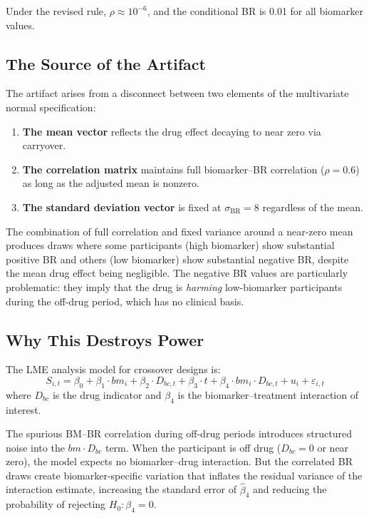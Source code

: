\documentclass[11pt]{article}
\begin{document}
Under the revised rule, $\rho \approx 10^{-6}$, and the
conditional BR is 0.01 for all biomarker values.

\subsection{The Source of the Artifact}

The artifact arises from a disconnect between two elements of
the multivariate normal specification:

\begin{enumerate}
\item \textbf{The mean vector} reflects the drug effect
  decaying to near zero via carryover.
\item \textbf{The correlation matrix} maintains full
  biomarker--BR correlation ($\rho = 0.6$) as long as the
  adjusted mean is nonzero.
\item \textbf{The standard deviation vector} is fixed at
  $\sigma_{\text{BR}} = 8$ regardless of the mean.
\end{enumerate}

The combination of full correlation and fixed variance around
a near-zero mean produces draws where some participants (high
biomarker) show substantial positive BR and others (low
biomarker) show substantial negative BR, despite the mean
drug effect being negligible. The negative BR values are
particularly problematic: they imply that the drug is
\emph{harming} low-biomarker participants during the off-drug
period, which has no clinical basis.

\subsection{Why This Destroys Power}

The LME analysis model for crossover designs is:
\[
S_{i,t} = \beta_0 + \beta_1 \cdot bm_i +
  \beta_2 \cdot D_{bc,t} + \beta_3 \cdot t +
  \beta_4 \cdot bm_i \cdot D_{bc,t} +
  u_i + \varepsilon_{i,t}
\]
where $D_{bc}$ is the drug indicator and $\beta_4$ is the
biomarker--treatment interaction of interest.

The spurious BM--BR correlation during off-drug periods
introduces structured noise into the $bm \cdot D_{bc}$
term. When the participant is off drug ($D_{bc} = 0$ or
near zero), the model expects no biomarker--drug interaction.
But the correlated BR draws create biomarker-specific variation
that inflates the residual variance of the interaction
estimate, increasing the standard error of $\hat{\beta}_4$
and reducing the probability of rejecting $H_0: \beta_4 = 0$.
\end{document}

